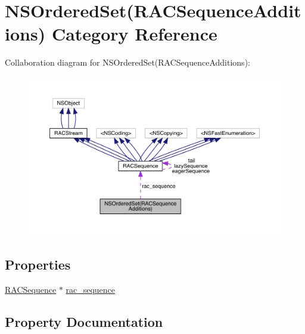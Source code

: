 \hypertarget{category_n_s_ordered_set_07_r_a_c_sequence_additions_08}{}\section{N\+S\+Ordered\+Set(R\+A\+C\+Sequence\+Additions) Category Reference}
\label{category_n_s_ordered_set_07_r_a_c_sequence_additions_08}


Collaboration diagram for N\+S\+Ordered\+Set(R\+A\+C\+Sequence\+Additions)\+:\nopagebreak
\begin{figure}[H]
\begin{center}
\leavevmode
\includegraphics[width=350pt]{category_n_s_ordered_set_07_r_a_c_sequence_additions_08__coll__graph}
\end{center}
\end{figure}
\subsection*{Properties}
\begin{DoxyCompactItemize}
\item 
\mbox{\hyperlink{interface_r_a_c_sequence}{R\+A\+C\+Sequence}} $\ast$ \mbox{\hyperlink{category_n_s_ordered_set_07_r_a_c_sequence_additions_08_a884ad04a6bf726cde25ad88f7a3df2c7}{rac\+\_\+sequence}}
\end{DoxyCompactItemize}


\subsection{Property Documentation}
\mbox{\label{category_n_s_ordered_set_07_r_a_c_sequence_additions_08_a884ad04a6bf726cde25ad88f7a3df2c7}} 
